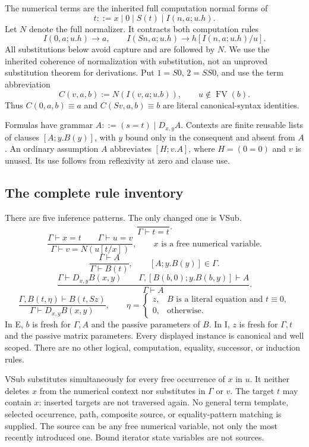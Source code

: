 \documentclass[11pt]{article}
\theoremstyle{definition}
\theoremstyle{remark}
\begin{document}
The numerical terms are the inherited full computation normal forms of
\[
 t::=x\mid0\mid S(t)\mid I(n,a;u.h).
\]
Let $N$ denote the full normalizer. It contracts both computation rules
\[
 I(0,a;u.h)\longrightarrow a,\qquad
 I(Sn,a;u.h)\longrightarrow h[I(n,a;u.h)/u].
\]
All substitutions below avoid capture and are followed by $N$. We use
the inherited coherence of normalization with substitution, not an
unproved substitution theorem for derivations. Put $1=S0$, $2=SS0$,
and use the term abbreviation
\[
 C(v,a,b):=N(I(v,a;u.b)),\qquad u\notin\operatorname{FV}(b).
\]
Thus $C(0,a,b)\equiv a$ and $C(Sv,a,b)\equiv b$ are literal
canonical-syntax identities.

Formulas have grammar $A::=(s=t)\mid D_{x,y}A$. Contexts are finite
reusable lists of clauses $[A;y.B(y)]$, with $y$ bound only in the
consequent and absent from $A$. An ordinary assumption $A$ abbreviates
$[H;v.A]$, where $H=(0=0)$ and $v$ is unused. Its use follows from
reflexivity at zero and clause use.

\subsection{The complete rule inventory}

There are five inference patterns. The only changed one is VSub.
\[
 \frac{}{\Gamma\vdash t=t}.\tag{Refl}
\]
\[
 \frac{\Gamma\vdash x=t\qquad\Gamma\vdash u=v}
      {\Gamma\vdash v=N(u[t/x])},
 \qquad x\text{ is a free numerical variable}.\tag{VSub}
\]
\[
 \frac{\Gamma\vdash A}{\Gamma\vdash B(t)},
 \qquad[A;y.B(y)]\in\Gamma.\tag{Use}
\]
\[
 \frac{\Gamma\vdash D_{x,y}B(x,y)\qquad
       \Gamma,[B(b,0);y.B(b,y)]\vdash A}
      {\Gamma\vdash A}.\tag{E}
\]
\[
 \frac{\Gamma,B(t,\eta)\vdash B(t,Sz)}
      {\Gamma\vdash D_{x,y}B(x,y)},\qquad
 \eta=\begin{cases}
 z,&B\text{ is a literal equation and }t\equiv0,\\
 0,&\text{otherwise}.
 \end{cases}\tag{I}
\]
In E, $b$ is fresh for $\Gamma,A$ and the passive parameters of $B$.
In I, $z$ is fresh for $\Gamma,t$ and the passive matrix parameters.
Every displayed instance is canonical and well scoped. There are no
other logical, computation, equality, successor, or induction rules.

VSub substitutes simultaneously for every free occurrence of $x$ in
$u$. It neither deletes $x$ from the numerical context nor substitutes
in $\Gamma$ or $v$. The target $t$ may contain $x$: inserted targets
are not traversed again. No general term template, selected occurrence,
path, composite source, or equality-pattern matching is supplied.
The source can be any free numerical variable, not only the most
recently introduced one. Bound iterator state variables are not sources.
\end{document}
